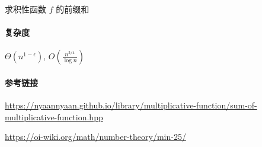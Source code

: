求积性函数 \(f\) 的前缀和

\paragraph{复杂度}

\(\Theta\left(n^{1-\epsilon}\right)\), \(O\left(\frac{n^{3/4}}{\log n}\right)\)

\paragraph{参考链接}

\url{https://nyaannyaan.github.io/library/multiplicative-function/sum-of-multiplicative-function.hpp}

\url{https://oi-wiki.org/math/number-theory/min-25/}
